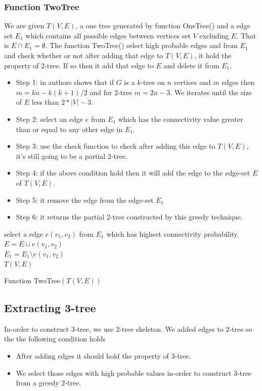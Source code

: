 \documentclass[12pt]{article}
\begin{document}
\subsubsection{Function TwoTree}
We are given $T(V,E)$, a one tree generated by function OneTree() and a edge set $E_1$ which contains all possible edges between vertices set $V$ excluding $E$. That is $E\cap E_1=\emptyset$. The function TwoTree() select high probable edges and from $E_1$ and check whether or not after adding that edge to $T(V,E)$, it hold the property of 2-tree. If so then it add that edge to $E$ and delete it from $E_1$.


\begin{itemize}[noitemsep]
\item Step 1: in \cite{Elmallah88partitioningthe} authors shows that if $G$ is a $k$-tree on $n$ vertices and $m$ edges then $m = kn - k(k +1)/2$ and for $2$-tree $m=2n-3$. We iterates until the size of $E$ less than $2*|V|-3$.
\item Step 2: select an edge $e$ from $E_1$ which has the connectivity value greater than or equal to any other edge in $E_1$.
\item Step 3: use the check function to check after adding this edge to $T(V,E)$, it's still going to be a partial 2-tree. 
\item Step 4: if the above condition hold then it will add the edge to the edge-set $E$ of $T(V,E)$.
\item Step 5: it remove the edge from the edge-set $E_1$
\item Step 6: it returns the partial 2-tree constructed by this greedy technique.
\end{itemize}

\begin{algorithm}
\nl {}
{
\nl select a edge $e(v_1,v_2)$ from $E_1$ which has highest connectivity probability.\\
\nl {}
{
\nl $E=E\cup e(v_1,v_2)$\\
}
\nl  $E_1=E_1 \setminus e(v_1,v_2)$  \\
}
\nl \Return $T(V,E)$
\caption{Function TwoTree$(T(V,E))$}
\end{algorithm}


\subsection{Extracting 3-tree}
In-order to construct $3$-tree, we use $2$-tree skeleton.
We added edges to $2$-tree so the the following condition holds
\begin{itemize}
\item After adding edges it should hold the property of $3$-tree.
\item We select those edges with high probable values in-order to construct $3$-tree from a greedy $2$-tree.
\end{itemize}
\end{document}
